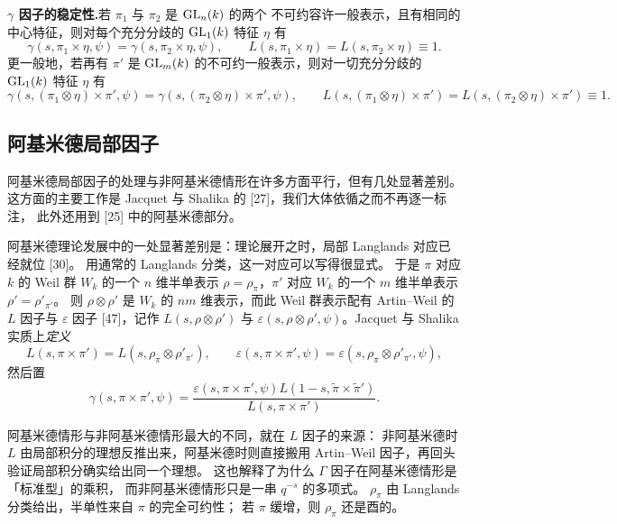 \textbf{$\gamma$ 因子的稳定性.}\quad 若 $\pi_1$ 与 $\pi_2$ 是 $\mathrm{GL}_n(k)$ 的两个
不可约容许一般表示，且有相同的中心特征，则对每个充分分歧的 $\mathrm{GL}_1(k)$ 特征 $\eta$ 有
\[
\gamma(s,\pi_1\times\eta,\psi)=\gamma(s,\pi_2\times\eta,\psi),
\qquad
L(s,\pi_1\times\eta)=L(s,\pi_2\times\eta)\equiv1.
\]
更一般地，若再有 $\pi'$ 是 $\mathrm{GL}_m(k)$ 的不可约一般表示，则对一切充分分歧的
$\mathrm{GL}_1(k)$ 特征 $\eta$ 有
\[
\gamma(s,(\pi_1\otimes\eta)\times\pi',\psi)
=\gamma(s,(\pi_2\otimes\eta)\times\pi',\psi),
\qquad
L(s,(\pi_1\otimes\eta)\times\pi')=L(s,(\pi_2\otimes\eta)\times\pi')\equiv1.
\]

\subsection{阿基米德局部因子}

阿基米德局部因子的处理与非阿基米德情形在许多方面平行，但有几处显著差别。
这方面的主要工作是 Jacquet 与 Shalika 的 [27]，我们大体依循之而不再逐一标注，
此外还用到 [25] 中的阿基米德部分。

阿基米德理论发展中的一处显著差别是：理论展开之时，局部 Langlands 对应已经就位 [30]。
用通常的 Langlands 分类，这一对应可以写得很显式。
于是 $\pi$ 对应 $k$ 的 Weil 群 $W_k$ 的一个 $n$ 维半单表示
$\rho=\rho_\pi$，$\pi'$ 对应 $W_k$ 的一个 $m$ 维半单表示 $\rho'=\rho'_{\pi'}$。
则 $\rho\otimes\rho'$ 是 $W_k$ 的 $nm$ 维表示，而此 Weil 群表示配有
Artin--Weil 的 $L$ 因子与 $\varepsilon$ 因子 [47]，记作 $L(s,\rho\otimes\rho')$
与 $\varepsilon(s,\rho\otimes\rho',\psi)$。Jacquet 与 Shalika 实质上\emph{定义}
\[
L(s,\pi\times\pi')=L(s,\rho_\pi\otimes\rho'_{\pi'}),
\qquad
\varepsilon(s,\pi\times\pi',\psi)=\varepsilon(s,\rho_\pi\otimes\rho'_{\pi'},\psi),
\]
然后置
\[
\gamma(s,\pi\times\pi',\psi)
=\frac{\varepsilon(s,\pi\times\pi',\psi)L(1-s,\widetilde{\pi}\times\widetilde{\pi}')}
{L(s,\pi\times\pi')}.
\]
\begin{annote}
阿基米德情形与非阿基米德情形最大的不同，就在 $L$ 因子的来源：
非阿基米德时 $L$ 由局部积分的理想反推出来，阿基米德时则直接搬用
Artin--Weil 因子，再回头验证局部积分确实给出同一个理想。
这也解释了为什么 $\Gamma$ 因子在阿基米德情形是「标准型」的乘积，
而非阿基米德情形只是一串 $q^{-s}$ 的多项式。
$\rho_\pi$ 由 Langlands 分类给出，半单性来自 $\pi$ 的完全可约性；
若 $\pi$ 缓增，则 $\rho_\pi$ 还是酉的。
\par{}
\end{annote}

